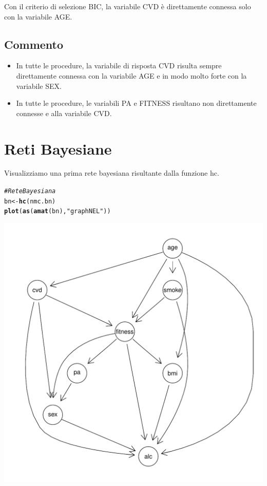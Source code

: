 \documentclass{article}\usepackage[]{graphicx}\usepackage[]{xcolor}
\makeatletter
\def\maxwidth{ %
  \ifdim\Gin@nat@width>\linewidth
    \linewidth
  \else
    \Gin@nat@width
  \fi
}
\newcommand{\hlstr}[1]{\textcolor[rgb]{0.192,0.494,0.8}{#1}}%
\newcommand{\hlcom}[1]{\textcolor[rgb]{0.678,0.584,0.686}{\textit{#1}}}%
\newcommand{\hlstd}[1]{\textcolor[rgb]{0.345,0.345,0.345}{#1}}%
\newcommand{\hlkwb}[1]{\textcolor[rgb]{0.69,0.353,0.396}{#1}}%
\newcommand{\hlkwd}[1]{\textcolor[rgb]{0.737,0.353,0.396}{\textbf{#1}}}%
\newenvironment{kframe}{%
 \def\at@end@of@kframe{}%
 \ifinner\ifhmode%
  \def\at@end@of@kframe{\end{minipage}}%
  \begin{minipage}{\columnwidth}%
 \fi\fi%
 \def\FrameCommand##1{\hskip\@totalleftmargin \hskip-\fboxsep
 \colorbox{shadecolor}{##1}\hskip-\fboxsep
     \hskip-\linewidth \hskip-\@totalleftmargin \hskip\columnwidth}%
 \MakeFramed {\advance\hsize-\width
   \@totalleftmargin\z@ \linewidth\hsize
   \@setminipage}}%
 {\par\unskip\endMakeFramed%
 \at@end@of@kframe}
\newenvironment{knitrout}{}{} %
\makeatother
\begin{document}
      Con il criterio di selezione BIC, la variabile CVD è direttamente connessa
      solo con la variabile AGE.
      
  \subsection{Commento}
    \begin{itemize}
      \item In tutte le procedure, la variabile di risposta CVD risulta
            sempre direttamente connessa con la variabile AGE e in modo molto
            forte con la variabile SEX.
      \item In tutte le procedure, le variabili PA e FITNESS risultano
            non direttamente connesse e alla variabile CVD.
    \end{itemize}
    
\clearpage


\section{Reti Bayesiane}
  Visualizziamo una prima rete bayesiana risultante dalla funzione hc. 
\begin{knitrout}
\color{fgcolor}\begin{kframe}
\begin{alltt}
\hlcom{#Rete Bayesiana}
\hlstd{bn} \hlkwb{<-} \hlkwd{hc}\hlstd{(nmc.bn)}
\hlkwd{plot}\hlstd{(}\hlkwd{as}\hlstd{(}\hlkwd{amat}\hlstd{(bn),} \hlstr{"graphNEL"}\hlstd{))}
\end{alltt}
\end{kframe}
\includegraphics[width=\maxwidth]{figure/Rete_Bayesiana-1} 
\end{knitrout}
  
\end{document}
